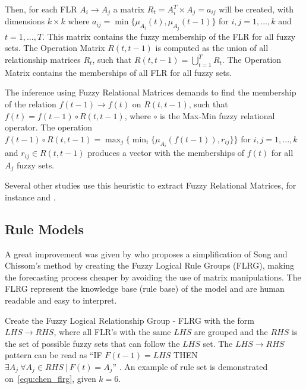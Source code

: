 Then, for each FLR $A_i\rightarrow A_j$  a matrix $R_t = A_i^T \times A_j = a_{ij}$ will be created, with dimensions $k \times k$ where $a_{ij} = \min\{\mu_{A_i}(t),\mu_{A_j}(t-1)\}$ for $i,j = 1,...,k$ and $t = 1,...,T$. This matrix contains the fuzzy membership of the FLR for all fuzzy sets. The Operation Matrix $R(t,t-1)$ is computed as the union of all relationship matrices $R_t$, such that $ R(t,t-1) = \bigcup_{t=1}^T R_t$. The Operation Matrix contains the memberships of all FLR for all fuzzy sets.

The inference using Fuzzy Relational Matrices  demands to find the membership of the relation $f(t-1) \rightarrow f(t)$ on $R(t,t-1)$, such that $f(t) = f(t-1)\circ R(t,t-1)$, where $\circ$ is the Max-Min fuzzy relational operator. The operation $f(t-1)\circ R(t,t-1) = \max_j\{\min_i\{ \mu_{A_i}( f(t-1)), r_{ij}  \} \}$ for $i,j = 1,...,k$ and $r_{ij} \in R(t,t-1)$ produces a vector with the memberships of $f(t)$ for all $A_j$ fuzzy sets.

Several other studies use this heuristic to extract Fuzzy Relational Matrices, for instance \cite{Song1997, hwang1998handling, Song1999, Chen2000, Chen2006a,  Cheng2008, Jilani2008a, Davari2009, Qiu2011,Cheng2012, Qiu2013} and \cite{Chuang2014}.

%
\subsection{Rule Models}
\label{sec:fts_rules}

A great improvement was given by \cite{chen1996forecasting} who proposes a  simplification of Song and Chissom's method by creating the Fuzzy Logical Rule Groups (FLRG), making the forecasting process cheaper by avoiding the use of matrix manipulations. The FLRG represent the knowledge base (rule base) of the model and are human readable and easy to interpret. 

Create the Fuzzy Logical Relationship Group - FLRG with the form $LHS \rightarrow RHS$, where all FLR's with the same $LHS$ are grouped and the $RHS$ is the set of possible fuzzy sets that can follow the $LHS$ set. The $LHS \rightarrow RHS$ pattern can be read as ``IF $F(t-1) = LHS$ THEN $\exists A_j\ \forall A_j \in RHS\ |\ F(t) = A_j$'' . An example of rule set is demonstrated on~\eqref{equ:chen_flrg}, given $k=6$. 

